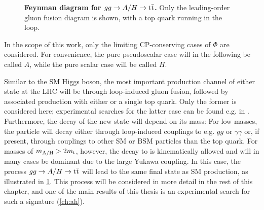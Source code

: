 \begin{figure}[t!]
    \centering
    \caption{\textbf{Feynman diagram for $gg \rightarrow A/H \rightarrow \mathrm{t \bar{t}}$.} Only the leading-order gluon fusion diagram is shown, with a top quark running in the loop.}
    \label{fig:theory:ggAH}
\end{figure}

In the scope of this work, only the limiting CP-conserving cases of $\Phi$ are considered. For convenience, the pure pseudoscalar case will in the following be called $A$, while the pure scalar case will be called $H$.

Similar to the SM Higgs boson, the most important production channel of either state at the LHC will be through loop-induced gluon fusion, followed by associated production with either \ttbar or a single top quark. Only the former is considered here; experimental searches for the latter case can be found e.g. in . Furthermore, the decay of the new state will depend on its mass: For low masses, the particle will decay either through loop-induced couplings to e.g. $gg$ or $\gamma \gamma$ or, if present, through couplings to other SM or BSM particles than the top quark. For masses of $m_{\mathrm{A/H}} > 2 m_{\mathrm{t}}$, however, the decay to \ttbar is kinematically allowed and will in many cases be dominant due to the large Yukawa coupling. In this case, the process $gg \rightarrow A/H \rightarrow \mathrm{t \bar{t}}$ will lead to the same final state as SM \ttbar production, as illustrated in \cref{fig:theory:ggAH}. This process will be considered in more detail in the rest of this chapter, and one of the main results of this thesis is an experimental search for such a signature (\cref{ch:ah}).



